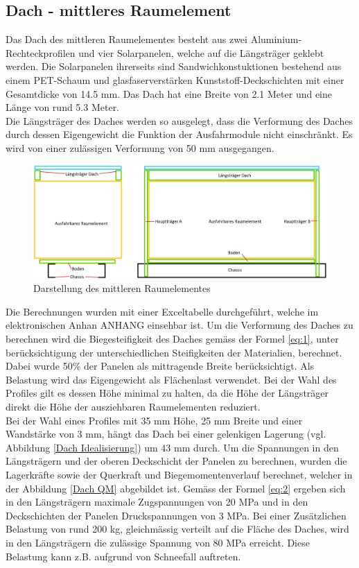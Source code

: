 \subsection{Dach - mittleres Raumelement}
\label{Dach}
Das Dach des mittleren Raumelementes besteht aus zwei Aluminium-Rechteckprofilen und vier Solarpanelen, welche auf die Längsträger geklebt werden. Die Solarpanelen ihrerseits sind Sandwichkonstuktionen bestehend aus einem PET-Schaum und glasfaserverstärken Kunststoff-Deckschichten mit einer Gesamtdicke von 14.5 mm. Das Dach hat eine Breite von 2.1 Meter und eine Länge von rund 5.3 Meter.\\
Die Längsträger des Daches werden so ausgelegt, dass die Verformung des Daches durch dessen Eigengewicht die Funktion der Ausfahrmodule nicht einschränkt. Es wird von einer zulässigen Verformung von 50 mm ausgegangen.

\begin{figure}[h]
  \includegraphics[width=\linewidth]{04_Figures/Dach.png}
  \caption{Darstellung des mittleren Raumelementes}
  \label{img:Dach}
\end{figure}

Die Berechnungen wurden mit einer Exceltabelle durchgeführt, welche im elektronischen Anhan ANHANG einsehbar ist.
Um die Verformung des Daches zu berechnen wird die Biegesteifigkeit des Daches gemäss der Formel \ref{eq:1}, unter berücksichtigung der unterschiedlichen Steifigkeiten der Materialien, berechnet. Dabei wurde 50\% der Panelen als mittragende Breite berücksichtigt. Als Belastung wird das Eigengewicht als Flächenlast verwendet. Bei der Wahl des Profiles gilt es dessen Höhe minimal zu halten, da die Höhe der Längsträger direkt die Höhe der ausziehbaren Raumelementen reduziert.\\
Bei der Wahl eines Profiles mit 35 mm Höhe, 25 mm Breite und einer Wandstärke von 3 mm, hängt das Dach bei einer gelenkigen Lagerung (vgl. Abbildung \ref{Dach Idealisierung}) um 43 mm durch. Um die Spannungen in den Längsträgern und der oberen Deckschicht der Panelen zu berechnen, wurden die Lagerkräfte sowie der Querkraft und Biegemomentenverlauf berechnet, welcher in der Abbildung \ref{Dach QM} abgebildet ist. Gemäss der Formel \ref{eq:2} ergeben sich in den Längsträgern maximale Zugspannungen von 20 MPa und in den Deckschichten der Panelen Druckspannungen von 3 MPa. Bei einer Zusätzlichen Belastung von rund 200 kg, gleichmässig verteilt auf die Fläche des Daches, wird in den Längsträgern die zulässige Spannung von 80 MPa erreicht. Diese Belastung kann z.B. aufgrund von Schneefall auftreten.

